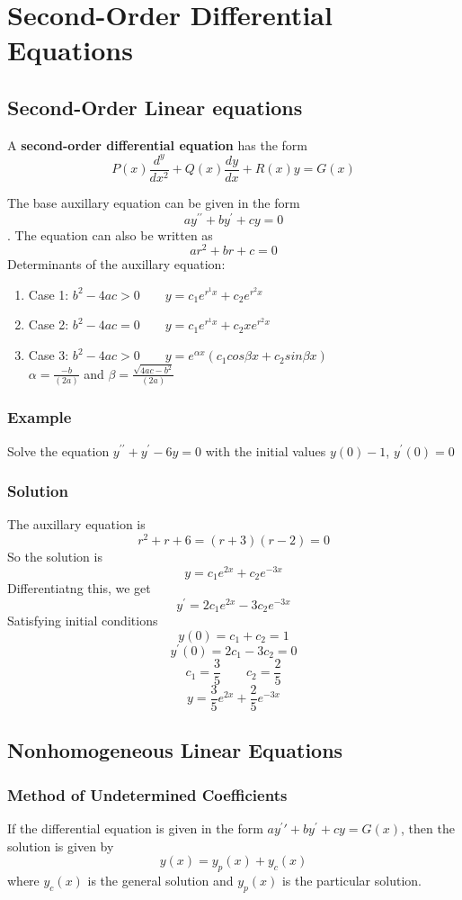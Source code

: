 \setcounter{chapter}{17}
\chapter{Second-Order Differential Equations}

\section{Second-Order Linear equations}
A \textbf{second-order differential equation} has the form
$$P(x)\frac{d^y}{dx^2} + Q(x)\frac{dy}{dx} + R(x)y = G(x)$$

The base auxillary equation can be given in the form
$$ay^{\prime\prime} + by^\prime + cy = 0$$. The equation can also be written as 
$$ar^2+br+c = 0$$
Determinants of the auxillary equation:
\begin{enumerate}
    \item Case 1: $b^2 - 4ac > 0\qquad y = c_1e^{r^1x} + c_2e^{r^2x}$
    \item Case 2: $b^2 - 4ac = 0\qquad y = c_1e^{r^1x} + c_2xe^{r^2x}$
    \item Case 3: $b^2 - 4ac > 0\qquad y = e^{\alpha x}(c_1cos\beta x + c_2sin\beta x)$\\$\alpha = \frac{-b}{(2a)}$ and $\beta = \frac{\sqrt{4ac-b^2}}{(2a)}$
\end{enumerate}
\subsection*{Example}
Solve the equation $y^{\prime\prime} + y^\prime - 6y = 0$ with the initial values $y(0) - 1$, $y^\prime(0) = 0$
\subsection*{Solution}
The auxillary equation is
$$r^2 + r + 6 = (r+3)(r-2) = 0$$ So the solution is
$$y = c_1e^{2x}+c_2e^{-3x}$$ Differentiatng this, we get
$$y^\prime = 2c_1e^{2x} - 3c_2e^{-3x}$$ Satisfying initial conditions
$$y(0) = c_1 + c_2 = 1$$ $$y^\prime(0) = 2c_1 - 3c_2 = 0$$ $$c_1 = \frac{3}{5}\qquad c_2 = \frac{2}{5}$$ $$y = \frac{3}{5}e^{2x} + \frac{2}{5}e^{-3x}$$ 

\section{Nonhomogeneous Linear Equations}
\subsection*{Method of Undetermined Coefficients}
If the differential equation is given in the form $ay^\prime\prime + by^\prime + cy = G(x)$, then the solution is given by
$$y(x) = y_p(x) + y_c(x)$$
where $y_c(x)$ is the general solution and $y_p(x)$ is the particular solution.

